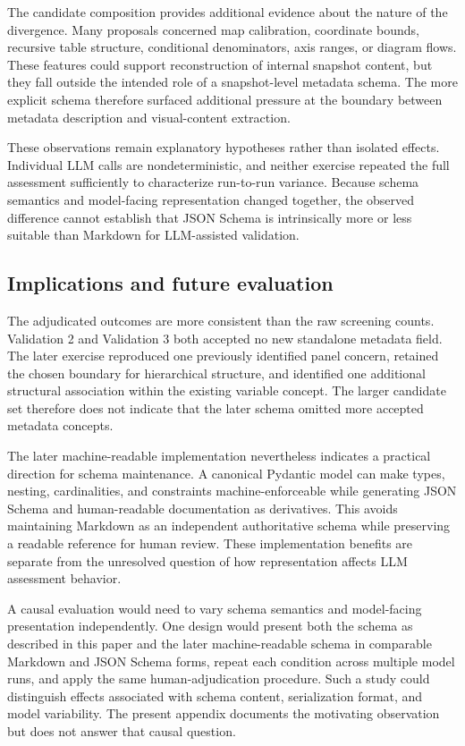 \documentclass{article}
\begin{document}
The candidate composition provides additional evidence about the nature of the divergence. Many proposals concerned map calibration, coordinate bounds, recursive table structure, conditional denominators, axis ranges, or diagram flows. These features could support reconstruction of internal snapshot content, but they fall outside the intended role of a snapshot-level metadata schema. The more explicit schema therefore surfaced additional pressure at the boundary between metadata description and visual-content extraction.

These observations remain explanatory hypotheses rather than isolated effects. Individual LLM calls are nondeterministic, and neither exercise repeated the full assessment sufficiently to characterize run-to-run variance. Because schema semantics and model-facing representation changed together, the observed difference cannot establish that JSON Schema is intrinsically more or less suitable than Markdown for LLM-assisted validation.

\subsection{Implications and future evaluation}

The adjudicated outcomes are more consistent than the raw screening counts. Validation 2 and Validation 3 both accepted no new standalone metadata field. The later exercise reproduced one previously identified panel concern, retained the chosen boundary for hierarchical structure, and identified one additional structural association within the existing variable concept. The larger candidate set therefore does not indicate that the later schema omitted more accepted metadata concepts.

The later machine-readable implementation nevertheless indicates a practical direction for schema maintenance. A canonical Pydantic model can make types, nesting, cardinalities, and constraints machine-enforceable while generating JSON Schema and human-readable documentation as derivatives. This avoids maintaining Markdown as an independent authoritative schema while preserving a readable reference for human review. These implementation benefits are separate from the unresolved question of how representation affects LLM assessment behavior.

A causal evaluation would need to vary schema semantics and model-facing presentation independently. One design would present both the schema as described in this paper and the later machine-readable schema in comparable Markdown and JSON Schema forms, repeat each condition across multiple model runs, and apply the same human-adjudication procedure. Such a study could distinguish effects associated with schema content, serialization format, and model variability. The present appendix documents the motivating observation but does not answer that causal question.
\end{document}
